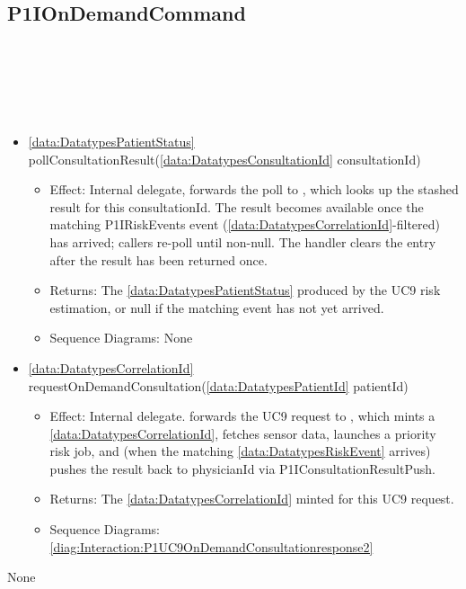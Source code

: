  \subsection{P1IOnDemandCommand}\label{int:InterfacesP1IOnDemandCommand}
    \begin{description}
      \item[Provided by:] \iconcomponent{}~
      \item[Required by:] \iconcomponent{}~ 
      \item[Operations:] ~
    \begin{itemize}[noitemsep,nolistsep,leftmargin=-.25cm]
      \item \textsf{\ref{data:DatatypesPatientStatus} pollConsultationResult(\ref{data:DatatypesConsultationId} consultationId)}
        \begin{itemize}[noitemsep,nolistsep]
           \item Effect: Internal delegate,  forwards the poll to , which looks up the stashed result for this consultationId. The result becomes available once the matching P1IRiskEvents event (\ref{data:DatatypesCorrelationId}-filtered) has arrived; callers re-poll until non-null. The handler clears the entry after the result has been returned once. 
           \item Returns: The \ref{data:DatatypesPatientStatus} produced by the UC9 risk estimation, or null if the matching event has not yet arrived.
           \item Sequence Diagrams: None
        \end{itemize}
      \item \textsf{\ref{data:DatatypesCorrelationId} requestOnDemandConsultation(\ref{data:DatatypesPatientId} patientId)}
        \begin{itemize}[noitemsep,nolistsep]
           \item Effect: Internal delegate.  forwards the UC9 request to , which mints a \ref{data:DatatypesCorrelationId}, fetches sensor data, launches a priority risk job, and (when the matching \ref{data:DatatypesRiskEvent} arrives) pushes the result back to physicianId via P1IConsultationResultPush. 
           \item Returns: The \ref{data:DatatypesCorrelationId} minted for this UC9 request.
           \item Sequence Diagrams: \cref{diag:Interaction:P1UC9OnDemandConsultationresponse2}
        \end{itemize}
    \end{itemize}
      \item[Diagrams:] None
    \end{description}

